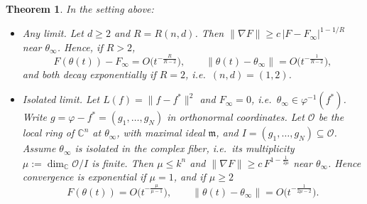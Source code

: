 \documentclass[11pt]{article}
\newtheorem{theorem}{Theorem}
\theoremstyle{remark}
\newcommand{\C}{\mathbb{C}}
\newcommand{\cO}{\mathcal{O}}
\newcommand{\m}{\mathfrak{m}}
\begin{document}
\begin{theorem}\label{thm:main}
In the setting above:
\begin{itemize}
\item[(a)] \emph{Any limit.} Let $d\ge2$ and $R=R(n,d)$. Then $\|\nabla F\|\ge c\,|F-F_\infty|^{1-1/R}$ near $\theta_\infty$. Hence, if $R>2$,
\[
F(\theta(t))-F_\infty=O\big(t^{-\frac{R}{R-2}}\big),\qquad \|\theta(t)-\theta_\infty\|=O\big(t^{-\frac{1}{R-2}}\big),
\]
and both decay exponentially if $R=2$, i.e.\ $(n,d)=(1,2)$.
\item[(b)] \emph{Isolated limit.} Let $L(f)=\|f-f^*\|^2$ and $F_\infty=0$, i.e.\ $\theta_\infty\in\varphi^{-1}(f^*)$. Write $g=\varphi-f^*=(g_1,\dots,g_N)$ in orthonormal coordinates. Let $\cO$ be the local ring of $\C^n$ at $\theta_\infty$, with maximal ideal $\m$, and $I=(g_1,\dots,g_N)\subseteq\cO$. Assume $\theta_\infty$ is isolated in the complex fiber, i.e.\ its multiplicity $\mu:=\dim_\C\cO/I$ is finite. Then $\mu\le k^n$ and $\|\nabla F\|\ge c\,F^{1-\frac1{2\mu}}$ near $\theta_\infty$. Hence convergence is exponential if $\mu=1$, and if $\mu\ge2$
\[
F(\theta(t))=O\big(t^{-\frac{\mu}{\mu-1}}\big),\qquad \|\theta(t)-\theta_\infty\|=O\big(t^{-\frac{1}{2\mu-2}}\big).
\]
\end{itemize}
\end{theorem}
\end{document}
